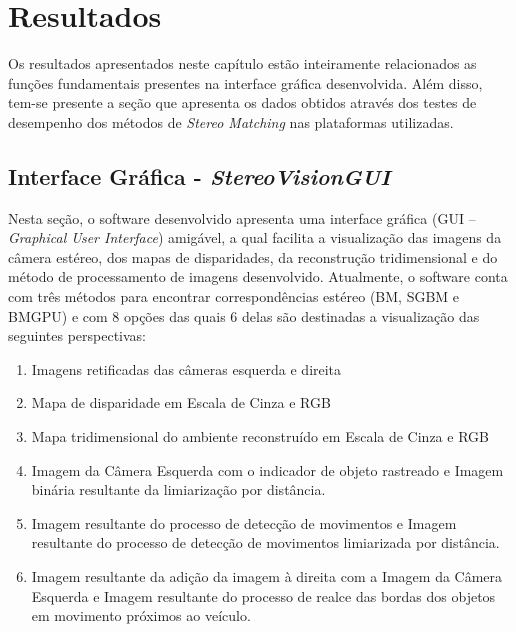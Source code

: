 \chapter{Resultados}
\label{Resultados}

Os resultados apresentados neste capítulo estão inteiramente relacionados as funções fundamentais presentes na interface gráfica desenvolvida. Além disso, tem-se presente a seção que apresenta 
os dados obtidos através dos testes de desempenho dos métodos de \textit{Stereo Matching} nas plataformas utilizadas.


\section{Interface Gráfica - \textit{StereoVisionGUI}}

Nesta seção, o software desenvolvido apresenta uma interface gráfica (GUI -- \textit{Graphical User Interface}) amigável, a qual facilita a visualização das imagens da câmera estéreo, 
dos mapas de disparidades, da reconstrução tridimensional e do método de processamento de imagens desenvolvido. Atualmente, o software conta com três métodos para encontrar correspondências 
estéreo (BM, SGBM e BMGPU) e com 8 opções das quais 6 delas são destinadas a visualização das seguintes perspectivas:

\begin{enumerate}
  \item Imagens retificadas das câmeras esquerda e direita
  \item Mapa de disparidade em Escala de Cinza e RGB
  \item Mapa tridimensional do ambiente reconstruído em Escala de Cinza e RGB
  \item Imagem da Câmera Esquerda com o indicador de objeto rastreado e Imagem binária resultante da limiarização por distância.
  \item Imagem resultante do processo de detecção de movimentos e Imagem resultante do processo de detecção de movimentos limiarizada por distância. 
  \item Imagem resultante da adição da imagem à direita com a Imagem da Câmera Esquerda e Imagem resultante do processo de realce das bordas dos objetos em movimento próximos ao veículo.
\end{enumerate} 

